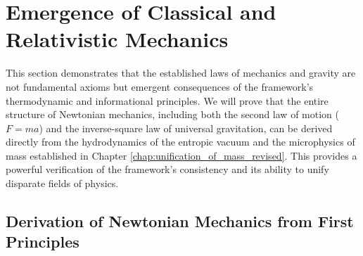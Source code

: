 \documentclass[11pt, letterpaper]{report}
\theoremstyle{plain} %
\theoremstyle{definition} %
\theoremstyle{remark} %
\begin{document}
\section{Emergence of Classical and Relativistic Mechanics}
\label{sec:verify_mechanics}

This section demonstrates that the established laws of mechanics and gravity are not fundamental axioms but emergent consequences of the framework’s thermodynamic and informational principles. We will prove that the entire structure of Newtonian mechanics, including both the second law of motion ($F=ma$) and the inverse-square law of universal gravitation, can be derived directly from the hydrodynamics of the entropic vacuum and the microphysics of mass established in Chapter \ref{chap:unification_of_mass_revised}. This provides a powerful verification of the framework's consistency and its ability to unify disparate fields of physics.

\subsection{Derivation of Newtonian Mechanics from First Principles}
\label{subsec:newtonian_first_principles}
\end{document}
